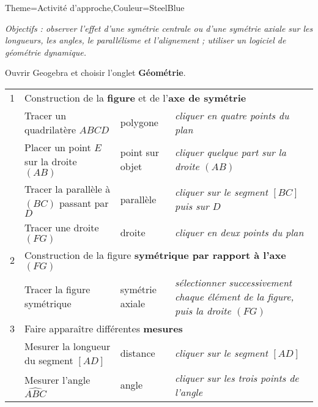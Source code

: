 \begin{Maquette}[Cours]{Theme={Activité d'approche},Couleur={SteelBlue}}


      {\it Objectifs : observer l'effet d'une symétrie centrale ou d'une symétrie axiale sur les longueurs, les angles, le parallélisme et l'alignement ; utiliser un logiciel de géométrie dynamique.}

      \begin{AActivite}

         Ouvrir Geogebra et choisir l'onglet \textbf{Géométrie}.

            \begin{center}
               {
               \begin{tabular}{|c|p{6cm}|p{2.6cm}|>{\itshape\footnotesize}p{5cm}|}
                  \hline
                  1 & \multicolumn{3}{l|}{Construction de la {\bf figure} et de l'{\bf axe de symétrie}} \\
                  & Tracer un quadrilatère $ABCD$ & polygone & cliquer en quatre points du plan \\
                  & Placer un point $E$ sur la droite $(AB)$ & point sur objet & cliquer quelque part sur la droite $(AB)$ \\
                  & Tracer la parallèle à $(BC)$ passant par $D$ & parallèle & cliquer sur le segment $[BC]$ puis sur $D$ \\
                  & Tracer une droite $(FG)$ & droite & cliquer en deux points du plan \\
                  \hline
                  2 & \multicolumn{3}{l|}{Construction de la figure {\bf symétrique par rapport à l'axe} $(FG)$} \\
                  & Tracer la figure symétrique & symétrie axiale & sélectionner successivement chaque élément de la figure, puis la droite $(FG)$ \\
                  \hline
                  3 & \multicolumn{3}{l|}{Faire apparaître différentes {\bf mesures}} \\
                  & Mesurer la longueur du segment $[AD]$ & distance & cliquer sur le segment $[AD]$ \\
                  & Mesurer l'angle $\widehat{ABC}$ & angle & cliquer sur les trois points de l'angle \\
                  \hline
               \end{tabular}}

\end{center}
\end{AActivite}
\end{Maquette}

